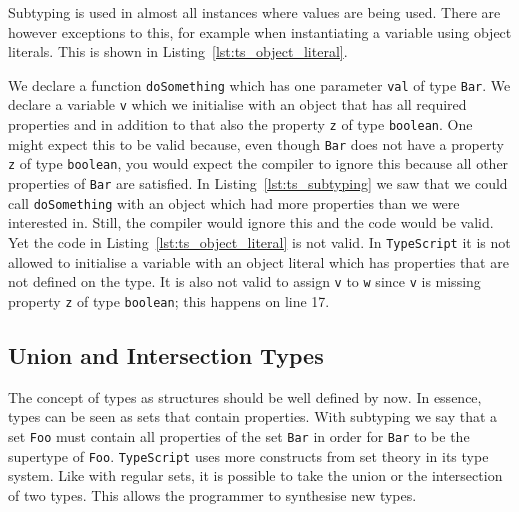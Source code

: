 \documentclass{article}
\newcommand{\ttt}[1]{\texttt{#1}}
\begin{document}
Subtyping is used in almost all instances where values are being used.
There are however exceptions to this, for example when instantiating a variable using object literals.
This is shown in Listing~\ref{lst:ts_object_literal}.
\begin{center}
    \begin{minipage}{.75\textwidth}
    
    \end{minipage}
\end{center}
We declare a function \ttt{doSomething} which has one parameter \ttt{val} of type \ttt{Bar}.
We declare a variable \ttt{v} which we initialise with an object that has all required properties and in addition to that also the property \ttt{z} of type \ttt{boolean}.
One might expect this to be valid because, even though \ttt{Bar} does not have a property \ttt{z} of type \ttt{boolean}, you would expect the compiler to ignore this because all other properties of \ttt{Bar} are satisfied.
In Listing~\ref{lst:ts_subtyping} we saw that we could call \ttt{doSomething} with an object which had more properties than we were interested in.
Still, the compiler would ignore this and the code would be valid.
Yet the code in Listing~\ref{lst:ts_object_literal} is not valid.
In \ttt{TypeScript} it is not allowed to initialise a variable with an object literal which has properties that are not defined on the type.
It is also not valid to assign \ttt{v} to \ttt{w} since \ttt{v} is missing property \ttt{z} of type \ttt{boolean}; this happens on line 17. 

\subsection{Union and Intersection Types}
The concept of types as structures should be well defined by now.
In essence, types can be seen as sets that contain properties.
With subtyping we say that a set \ttt{Foo} must contain all properties of the set \ttt{Bar} in order for \ttt{Bar} to be the supertype of \ttt{Foo}.
\ttt{TypeScript} uses more constructs from set theory in its type system.
Like with regular sets, it is possible to take the union or the intersection of two types.
This allows the programmer to synthesise new types.
\end{document}
